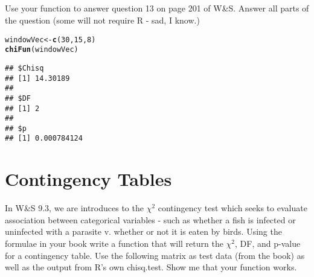 \documentclass{article}\usepackage[]{graphicx}\usepackage[]{color}
\makeatletter
\newcommand{\hlnum}[1]{\textcolor[rgb]{0.686,0.059,0.569}{#1}}%
\newcommand{\hlstd}[1]{\textcolor[rgb]{0.345,0.345,0.345}{#1}}%
\newcommand{\hlkwb}[1]{\textcolor[rgb]{0.69,0.353,0.396}{#1}}%
\newcommand{\hlkwd}[1]{\textcolor[rgb]{0.737,0.353,0.396}{\textbf{#1}}}%
\newenvironment{kframe}{%
 \def\at@end@of@kframe{}%
 \ifinner\ifhmode%
  \def\at@end@of@kframe{\end{minipage}}%
  \begin{minipage}{\columnwidth}%
 \fi\fi%
 \def\FrameCommand##1{\hskip\@totalleftmargin \hskip-\fboxsep
 \colorbox{shadecolor}{##1}\hskip-\fboxsep
     \hskip-\linewidth \hskip-\@totalleftmargin \hskip\columnwidth}%
 \MakeFramed {\advance\hsize-\width
   \@totalleftmargin\z@ \linewidth\hsize
   \@setminipage}}%
 {\par\unskip\endMakeFramed%
 \at@end@of@kframe}
\newenvironment{knitrout}{}{} %
\makeatother
\begin{document}
\subsection{}
Use your function to answer question 13 on page 201 of W\&S.  Answer all parts of the question (some will not require R - sad, I know.)
\begin{knitrout}
\color{fgcolor}\begin{kframe}
\begin{alltt}
\hlstd{windowVec}\hlkwb{<-}\hlkwd{c}\hlstd{(}\hlnum{30}\hlstd{,}\hlnum{15}\hlstd{,}\hlnum{8}\hlstd{)}
\hlkwd{chiFun}\hlstd{(windowVec)}
\end{alltt}
\begin{verbatim}
## $Chisq
## [1] 14.30189
## 
## $DF
## [1] 2
## 
## $p
## [1] 0.000784124
\end{verbatim}
\end{kframe}
\end{knitrout}

\section{Contingency Tables}
In W\&S 9.3, we are introduces to the $\chi^2$ contingency test which seeks to evaluate association between categorical variables - such as whether a fish is infected or uninfected with a parasite v. whether or not it is eaten by birds.  Using the formulae in your book write a function that will return the $\chi^2$, DF, and p-value for a contingency table.  Use the following matrix as test data (from the book) as well as the output from R's own chisq.test.  Show me that your function works.
\end{document}
